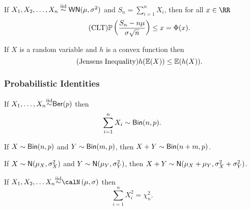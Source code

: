 \vspace{1cm}

If $X_1 , X_2 , \ldots , X_n \overset{\text{iid}}{\sim} {\sf WN} (\mu,\sigma^2)$ and $S_n = \sum_{i=1}^{n} X_i$, then for all $x \in \RR$
\begin{equation}
    \tag{CLT} {\mathbb{P}} \left( \frac{S_n - n \mu}{\sigma \sqrt{n}} \right) \leq x = \Phi (x) .
\end{equation}

\vspace{1cm}

If $X$ is a random variable and $h$ is a convex function then
\begin{equation}
    \tag{Jensens Inequality} h({\mathbb{E}} (X)) \leq {\mathbb{E}} (h(X)).
\end{equation}

\subsubsection*{Probabilistic Identities}

If $X_1 , \ldots , X_n {\overset{\text{iid}}{\sim}} {\sf Ber}(p)$ then
\begin{equation}
    \sum_{i=1}^{n} X_i \sim {\sf Bin} (n,p).
\end{equation}

\vspace{1cm}

If $X \sim {\sf Bin} (n,p)$ and $Y \sim {\sf Bin} (m,p)$, then $X + Y \sim {\sf Bin} (n+m,p)$.

\vspace{1cm}

If $X \sim {\sf N} (\mu_X,\sigma^2_X)$ and $Y \sim {\sf N} (\mu_Y,\sigma^2_Y)$, then $X + Y \sim {\sf N} (\mu_X + \mu_Y,\sigma^2_X + \sigma^2_Y)$.

\vspace{1cm}

If $X_1 , X_2 , \ldots X_n \iid \calN \left( \mu , \sigma \right)$ then
\begin{equation}
    \sum_{i=1}^{n} X_i^2 = \chi_n^2 .
\end{equation}